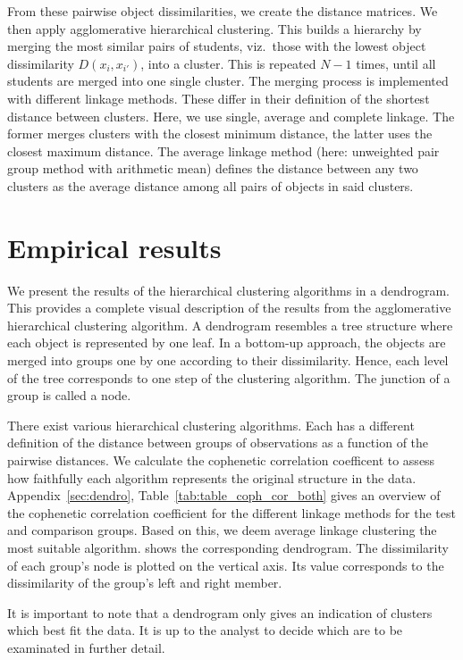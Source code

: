 \documentclass{edm_article}
\begin{document}
From these pairwise object dissimilarities, we create the distance matrices. We then apply agglomerative hierarchical clustering. This builds a hierarchy by merging the most similar pairs of students, viz.~those with the lowest object dissimilarity $D(x_i, x_{i'})$, into a cluster. This is repeated $N - 1$ times, until all students are merged into one single cluster. The merging process is implemented with different linkage methods. These differ in their definition of the shortest distance between clusters. Here, we use single, average and complete linkage. The former merges clusters with the closest minimum distance, the latter uses the closest maximum distance. The average linkage method (here: unweighted pair group method with arithmetic mean) defines the distance between any two clusters as the average distance among all pairs of objects in said clusters.

\section{Empirical results} \label{sec:analysis}
We present the results of the hierarchical clustering algorithms in a dendrogram. This provides a complete visual description of the results from the agglomerative hierarchical clustering algorithm. A dendrogram resembles a tree structure where each object is represented by one leaf. In a bottom-up approach, the objects are merged into groups one by one according to their dissimilarity. Hence, each level of the tree corresponds to one step of the clustering algorithm. The junction of a group is called a node. 

There exist various hierarchical clustering algorithms. Each has a different definition of the distance between groups of observations as a function of the pairwise distances. We calculate the cophenetic correlation coefficent to assess how faithfully each algorithm represents the original structure in the data. 
Appendix~\ref{sec:dendro}, Table~\ref{tab:table_coph_cor_both} gives an overview of the cophenetic correlation coefficient for the different linkage methods for the test and comparison groups. Based on this, we deem average linkage clustering the most suitable algorithm.
  shows the corresponding dendrogram. The dissimilarity of each group's node is plotted on the vertical axis. Its value corresponds to the dissimilarity of the group's left and right member.

It is important to note that a dendrogram only gives an indication of clusters which best fit the data. It is up to the analyst to decide which are to be examinated in further detail. 
\end{document}
